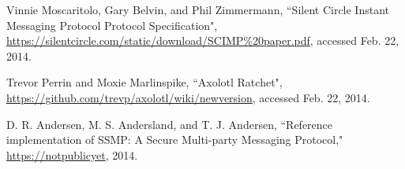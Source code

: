 \documentclass[%
preprint,
amsmath,amssymb,
aps,
prb,
floatfix,
]{revtex4-1}
\begin{document}
\begin{thebibliography}{99}
  Vinnie Moscaritolo, Gary Belvin, and Phil Zimmermann,
``Silent Circle Instant Messaging Protocol Protocol Specification",
\url{https://silentcircle.com/static/download/SCIMP%20paper.pdf}, accessed Feb.
22, 2014.

 Trevor Perrin and Moxie Marlinspike, ``Axolotl Ratchet",
\url{https://github.com/trevp/axolotl/wiki/newversion}, accessed Feb. 22, 2014.

 D. R. Andersen, M. S. Andersland, and T.
J. Andersen, ``Reference implementation of SSMP: A Secure Multi-party Messaging
Protocol," \url{https://notpublicyet}, 2014.

\end{thebibliography}
\end{document}
